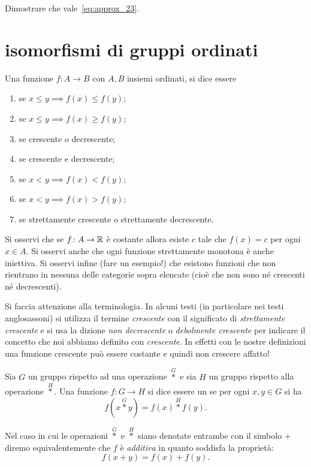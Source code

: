 \begin{exercise}
Dimostrare che vale~\eqref{eq:approx_23}.
\end{exercise}

\section{isomorfismi di gruppi ordinati}

\begin{definition}
  \label{def:monotonia}%
  \mymark{***}%
  Una funzione $f\colon A \to B$ con $A,B$ insiemi ordinati, si
  dice essere
  \begin{enumerate}
  \item {} se $x \le y \implies f(x) \le f(y)$;
  \item {} se $x \le y \implies f(x) \ge f(y)$;
  \item {} se crescente o decrescente;
  \item {} se crescente e decrescente;
  \item {} se $x<y \implies f(x) < f(y)$;
  \item {} se $x<y \implies f(x) > f(y)$;
  \item {} se strettamente crescente o strettamente decrescente.
  \end{enumerate}
  \end{definition}
  
  Si osservi che se $f\colon A \to \mathbb R$ è costante allora esiste $c$ tale che
  $f(x)=c$ per ogni $x\in A$. 
  Si osservi anche che ogni funzione strettamente monotona è anche iniettiva. Si osservi infine (fare un esempio!) che esistono funzioni che non rientrano in nessuna delle categorie sopra elencate (cioè che non sono né crescenti né decrescenti).
  
  Si faccia attenzione alla terminologia.
  In alcuni testi (in particolare nei testi anglosassoni) si utilizza il termine
  \emph{crescente} con il significato di \emph{strettamente crescente} 
  e si usa la dizione \emph{non decrescente} o \emph{debolmente crescente} 
  per indicare il concetto che noi abbiamo definito con \emph{crescente}. 
  In effetti con le nostre definizioni una funzione crescente può essere costante
  e quindi non crescere affatto!

\begin{definition}
  Sia $G$ un gruppo rispetto ad una operazione $\stackrel G *$ 
  e sia $H$ un gruppo rispetto alla operazione $\stackrel H *$.
  Una funzione $f\colon G \to H$ si dice essere un 
   se per ogni $x,y \in G$ si ha 
  \[
     f(x \stackrel G * y) = f(x) \stackrel H * f(y).  
  \]
  
  Nel caso in cui le operazioni $\stackrel G *$ e $\stackrel H *$ siano denotate 
  entrambe con il simbolo $+$ diremo equivalentemente che 
  $f$ è \emph{additiva} in quanto soddisfa la proprietà:
  \[
    f(x+y)  = f(x) + f(y).  
  \]
\end{definition}

